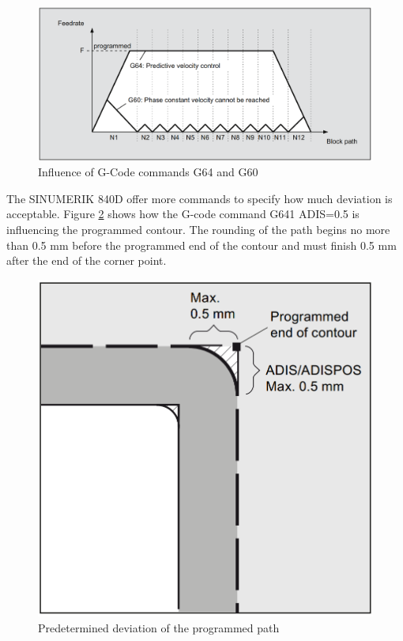  \begin{figure}[H]
 	\centerline{\includegraphics[width=\textwidth]{figures/conti1.png}}
 	\caption{Influence of G-Code commands G64 and G60~\cite{sinumericmanual}}
 	\label{C2}
 \end{figure}
 
The SINUMERIK 840D offer more commands to specify how much deviation is acceptable.
Figure \ref{C3} shows how the G-code command G641 ADIS=0.5 is influencing the programmed contour. The rounding of the path begins no more than 0.5 mm before the programmed end of the contour and must finish 0.5 mm after the end of the corner point. 
 
 \begin{figure}[H]
 	\centerline{\includegraphics[scale=.35]{figures/conti2.png}}
 	\caption{Predetermined deviation of the programmed path~\cite{sinumericmanual}}
 	\label{C3}
 \end{figure}

